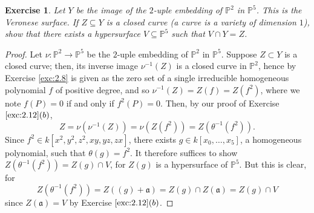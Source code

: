 \documentclass[12pt,letterpaper]{article}
\newtheorem{problem}{Exercise}[section]
\theoremstyle{definition}
\theoremstyle{remark}
\numberwithin{equation}{section}
\numberwithin{figure}{problem}
\newcommand{\PP}{\mathbb{P}}
\begin{document}
\begin{problem}
  Let $Y$ be the image of the $2$-uple embedding of $\PP^2$ in $\PP^5$. This is the
  \emph{Veronese surface}. If $Z \subseteq Y$ is a closed curve (a \emph{curve} is 
  a variety of dimension $1$), show that there exists a hypersurface $V \subseteq
  \PP^5$ such that $V \cap Y = Z$. 
\end{problem}
\begin{proof}
  Let $\nu\colon \PP^2 \to \PP^5$ be the $2$-uple embedding of $\PP^2$ in
  $\PP^5$. Suppose $Z \subset Y$ is a closed curve; then, its inverse image
  $\nu^{-1}(Z)$ is a closed curve in $\PP^2$, hence by Exercise \ref{exc:2.8} is
  given as the zero set of a single irreducible homogeneous polynomial $f$ of
  positive degree, and so $\nu^{-1}(Z) = Z(f) = Z(f^2)$, where we note $f(P) =
  0$ if and only if $f^2(P) = 0$. Then, by our proof of Exercise $\ref{exc:2.12}(b)$,
  \begin{equation*}
    Z = \nu(\nu^{-1}(Z)) = \nu(Z(f^2)) = Z(\theta^{-1}(f^2)).
  \end{equation*}
  Since $f^2 \in k[x^2,y^2,z^2,xy,yz,zx]$, there exists $g \in
  k[x_0,\ldots,x_5]$,
  a homogeneous polynomial, such that $\theta(g) = f^2$.
  It therefore suffices to show $Z(\theta^{-1}(f^2)) = Z(g) \cap V$, for $Z(g)$
  is a hypersurface of $\PP^5$. But this is clear, for
  \begin{equation*}
    Z(\theta^{-1}(f^2)) = Z((g)+\mathfrak{a}) = Z(g) \cap Z(\mathfrak{a}) =
    Z(g) \cap V
  \end{equation*}
  since $Z(\mathfrak{a}) = V$ by Exercise $\ref{exc:2.12}(b)$.
\end{proof}
\end{document}
